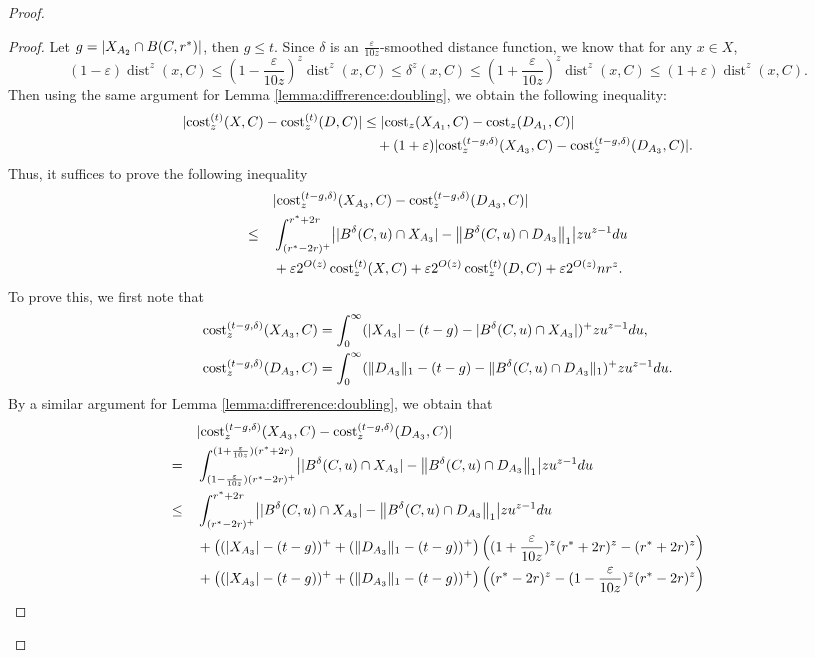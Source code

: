 \documentclass[11pt,letterpaper]{article}
\theoremstyle{definition}
\newcommand{\eps}{\varepsilon}
\DeclareMathOperator{\dist}{dist}
\DeclarePairedDelimiter{\abs}{\lvert}{\rvert}
\DeclarePairedDelimiter{\norm}{\lVert}{\rVert}
\begin{document}
\begin{proof}
\begin{proof}
Let $g=\abs{ X_{A_2}\cap B(C,r^\ast) }$, then $g\leq t$.
%
Since $\delta$ is an $\frac{\eps}{10z}$-smoothed distance function, we know that for any $x\in X$,
\[
(1-\eps) \dist^z(x,C)\leq (1-\frac{\eps}{10z})^z \dist^z(x,C) \leq \delta^z(x,C) \leq (1+\frac{\eps}{10z})^z \dist^z(x,C) \leq (1+\eps) \dist^z(x,C).
\]
%
Then using the same argument for Lemma \ref{lemma:diffrerence:doubling}, we obtain the following inequality:
\begin{align*}
\abs{ \cost[t]_z(X,C)-\cost[t]_z(D,C) } &\leq \abs{ \cost_z(X_{A_1},C)-\cost_z(D_{A_1},C) } \\
& \quad + (1+\eps)\abs{ \cost[t-g, \delta]_z(X_{A_3},C)-\cost[t-g, \delta]_z(D_{A_3},C) }.
\end{align*}
%
Thus, it suffices to prove the following inequality
\begin{align} \label{eq:cost_kzC}
\begin{aligned}
& \quad \abs{ \cost[t-g, \delta]_z(X_{A_3},C)-\cost[t-g, \delta]_z(D_{A_3},C) } \\
\leq & \quad \int_{(r^\ast-2r)^+}^{r^\ast+2r} \abs*{ |B^\delta(C,u)\cap X_{A_3}|-\norm[\big]{B^\delta(C,u)\cap D_{A_3}}_1 } z u^{z-1} du \\
	    &\quad +\eps 2^{O(z)} \cost^{(t)}_z(X,C) +\eps  2^{O(z)} \cost[t]_z(D,C) + \eps 2^{O(z)} n r^z.
\end{aligned}
\end{align}
%
To prove this, we first note that
	\begin{align*}
    	\cost[t-g,\delta]_z(X_{A_3},C)&= \int_{0}^{\infty} (\abs{X_{A_3}} - (t-g)-\vert B^\delta(C,u)\cap X_{A_3} \vert )^+ z u^{z-1} du, \\
	    \cost[t-g,\delta]_z (D_{A_3},C )&=\int_0^\infty (\norm{D_{A_3}}_1 - (t-g) - \norm{B^\delta(C,u)\cap D_{A_3}}_1)^+ z u^{z-1} du.
	\end{align*}
%
By a similar argument for Lemma \ref{lemma:diffrerence:doubling}, we obtain that
\begin{align}\label{eq:kzC_0}
\begin{aligned}
& \quad \abs{ \cost[t-g, \delta]_z(X_{A_3},C)-\cost[t-g, \delta]_z(D_{A_3},C) } \\
= & \quad \int_{(1-\frac{\eps}{10z})(r^\ast-2r)^+}^{(1+\frac{\eps}{10z})(r^\ast+2r)} \abs*{ |B^\delta(C,u)\cap X_{A_3}|-\norm[\big]{B^\delta(C,u)\cap D_{A_3}}_1 } z u^{z-1} du \\
\leq & \quad \int_{(r^\ast-2r)^+}^{r^\ast+2r} \abs*{ |B^\delta(C,u)\cap X_{A_3}|-\norm[\big]{B^\delta(C,u)\cap D_{A_3}}_1 } z u^{z-1} du \\
	    &\quad + \left((\abs{X_{A_3}}-(t-g))^+ + (\norm{D_{A_3}}_1 - (t-g))^+ \right) \left((1+\frac{\eps}{10z})^z(r^\ast +2r)^z - (r^\ast +2r)^z \right) \\
        & \quad + \left((\abs{X_{A_3}}-(t-g))^+ + (\norm{D_{A_3}}_1 - (t-g))^+ \right) \left((r^\ast -2r)^z - (1-\frac{\eps}{10z})^z(r^\ast - 2r)^z \right)
\end{aligned}
\end{align}


\end{proof}
\end{proof}
\end{document}
